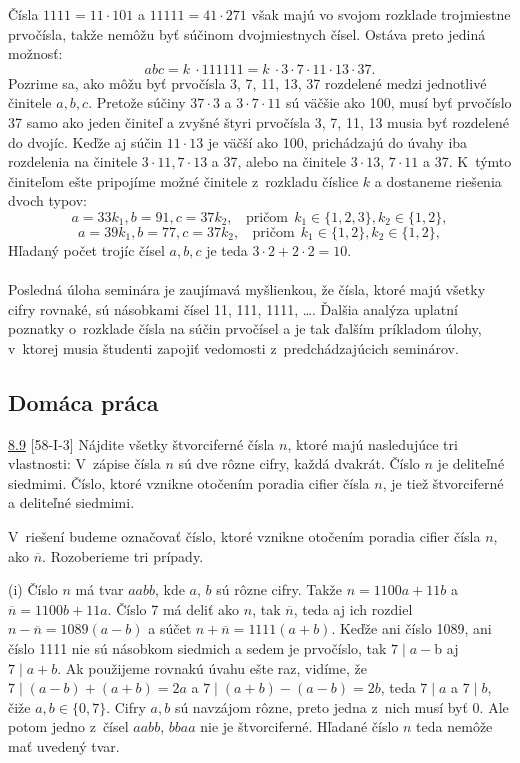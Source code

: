 Čísla $1 111 = 11\cdot 101$ a $11111 = 41\cdot 271$ však majú vo svojom rozklade trojmiestne prvočísla, takže nemôžu byť súčinom dvojmiestnych čísel. Ostáva preto jediná možnosť:
$$ abc = k~\cdot 111 111 = k~\cdot 3 \cdot 7 \cdot 11 \cdot 13 \cdot 37.$$
Pozrime sa, ako môžu byť prvočísla 3, 7, 11, 13, 37 rozdelené medzi jednotlivé činitele $a, b, c$. Pretože súčiny $37 \cdot 3$ a $3 \cdot 7 \cdot 11$ sú väčšie ako 100, musí byť prvočíslo 37 samo ako jeden činiteľ a zvyšné štyri prvočísla 3, 7, 11, 13 musia byť rozdelené do dvojíc. Keďže aj súčin $11 \cdot 13$ je väčší ako 100, prichádzajú do úvahy iba rozdelenia na činitele $3 \cdot 11, 7 \cdot 13$ a 37, alebo na činitele $3 \cdot 13$, $7 \cdot 11$ a 37. K~týmto činiteľom ešte pripojíme možné činitele z~rozkladu číslice $k$ a dostaneme riešenia dvoch typov:
$$a = 33k_1, b = 91, c = 37k_2, \ \ \ \ \text {pričom} \ \ k_1 \in \{1, 2, 3\}, k_2 \in \{1, 2\},$$
$$a = 39k_1, b = 77, c = 37k_2,\ \ \ \ \text{pričom}\ \ k_1 \in \{1, 2\}, k_2 \in \{1, 2\},$$
Hľadaný počet trojíc čísel $a, b, c$ je teda $3 \cdot 2 + 2 \cdot 2 = 10$.\\
\\
\kom Posledná úloha seminára je zaujímavá myšlienkou, že čísla, ktoré majú všetky cifry rovnaké, sú násobkami čísel 11, 111, 1111, \ldots. Ďalšia analýza uplatní poznatky o~rozklade čísla na súčin prvočísel a je tak ďalším príkladom úlohy, v~ktorej musia študenti zapojiť vedomosti z~predchádzajúcich seminárov.


\subsection*{Domáca práca}
\begin{tcolorbox}[breakable,notitle,boxrule=0pt,colback=light-gray,colframe=light-gray]\ul{8.9} [58-I-3] Nájdite všetky štvorciferné čísla $n$, ktoré majú nasledujúce tri vlastnosti: V~zápise čísla $n$ sú dve rôzne cifry, každá dvakrát. Číslo $n$ je deliteľné siedmimi. Číslo, ktoré vznikne otočením poradia cifier čísla $n$, je tiež štvorciferné a deliteľné siedmimi.

\end{tcolorbox}

\rieh V~riešení budeme označovať číslo, ktoré vznikne otočením poradia cifier čísla $n$, ako $\overline{n}$. Rozoberieme tri prípady.

(i) Číslo $n$ má tvar $aabb$, kde $a$, $b$ sú rôzne cifry. Takže $n = 1100a + 11b$ a $\overline{n} = 1100b + 11a$. Číslo 7 má deliť ako $n$, tak $\overline{n}$, teda aj ich rozdiel $n - \overline{n} = 1089(a - b)$ a súčet $n + \overline{n} = 1111(a + b)$. Keďže ani číslo 1089, ani číslo 1111 nie sú násobkom siedmich a sedem je prvočíslo, tak $7 \mid a - $b aj $7 \mid a + b$. Ak použijeme rovnakú úvahu ešte raz, vidíme, že $7 \mid (a - b) + (a + b) = 2a$ a $7 \mid (a + b) - (a - b) = 2b$, teda $7 \mid a$ a $7 \mid b$, čiže $a, b \in \{0, 7\}$. Cifry $a, b$ sú navzájom rôzne, preto jedna z~nich musí byť 0. Ale potom jedno z~čísel $aabb$, $bbaa$ nie je štvorciferné. Hľadané číslo $n$ teda nemôže mať uvedený tvar.

